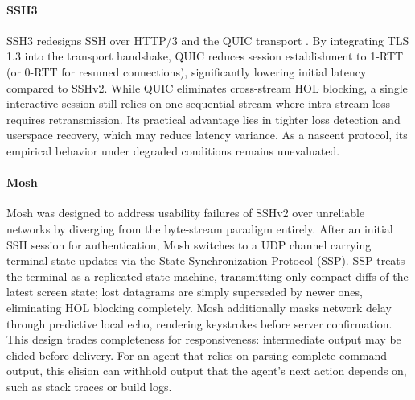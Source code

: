 \paragraph{SSH3}
SSH3 \cite{michel2023} redesigns SSH over HTTP/3 and the QUIC transport \cite{Iyengar2021}. By integrating TLS 1.3 into the transport handshake, QUIC reduces session establishment to 1-RTT (or 0-RTT for resumed connections), significantly lowering initial latency compared to SSHv2. While QUIC eliminates cross-stream HOL blocking, a single interactive session still relies on one sequential stream where intra-stream loss requires retransmission. Its practical advantage lies in tighter loss detection and userspace recovery, which may reduce latency variance. As a nascent protocol, its empirical behavior under degraded conditions remains unevaluated.

\paragraph{Mosh}
Mosh \cite{Winstein2012} was designed to address usability failures of SSHv2 over unreliable networks by diverging from the byte-stream paradigm entirely. After an initial SSH session for authentication, Mosh switches to a UDP channel carrying terminal state updates via the State Synchronization Protocol (SSP). SSP treats the terminal as a replicated state machine, transmitting only compact diffs of the latest screen state; lost datagrams are simply superseded by newer ones, eliminating HOL blocking completely. Mosh additionally masks network delay through predictive local echo, rendering keystrokes before server confirmation. This design trades completeness for responsiveness: intermediate output may be elided before delivery. For an agent that relies on parsing complete command output, this elision can withhold output that the agent's next action depends on, such as stack traces or build logs.

